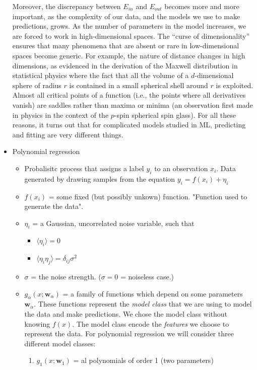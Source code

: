 \documentclass[norsk,a4paper,11pt]{article}
\begin{document}
\begin{itemize}
		Moreover, the discrepancy between $E_{in}$ and $E_{out}$ becomes more and more important, as the complexity of our data, and the models we use to make predictions, grows. As the number of parameters in the model increases, we are forced to work in high-dimensional spaces. The “curse of dimensionality” ensures that many phenomena that are absent or rare in low-dimensional spaces become generic. For example, the nature of distance changes in high dimensions, as evidenced in the derivation of the Maxwell distribution in statistical physics where the fact that all the volume of a $d$-dimensional sphere of radius $r$ is contained in a small spherical shell around $r$ is exploited. Almost all critical points of a function (i.e., the points where all derivatives vanish) are saddles rather than maxima or minima (an observation first made in physics in the context of the $p$-spin spherical spin glass). For all these reasons, it turns out that for complicated models studied in ML, predicting and fitting are very different things.
		\item Polynomial regression
		\begin{itemize}
			\item Probalisitc process that assigns a label $y_i$ to an observation $x_i$. Data generated by drawing samples from the equation $y_i = f(x_i) + \eta_i$
			\item $f(x_i)$ = some fixed (but possibly unkown) function. "Function used to generate the data".
			\item $\eta_i$ = a Gaussian, uncorrelated noise variable, such that
			\begin{itemize}
				\item $\langle \eta_i \rangle = 0$
				\item $\langle \eta_i \eta_j \rangle = \delta_{ij} \sigma^2$
			\end{itemize}
			\item $\sigma $ = the noise strength. ($\sigma = 0$ = noiseless case.)
			\item $g_\alpha (x; \mathbf{w}_\alpha)$ = a family of functions which depend on some parameters $\mathbf{w}_\alpha$. These functions represent the \textit{model class} that we are using to model the data and make predictions. We chose the model class without knowing $f(x)$. The model class encode the \textit{features} we choose to represent the data. For polynomial regression we will consider three different model classes:
			\begin{enumerate}[i]
				\item $g_1 (x; \mathbf{w}_1)$ = al polynomials of order 1 (two parameters)

\end{enumerate}
\end{itemize}
\end{itemize}
\end{document}
